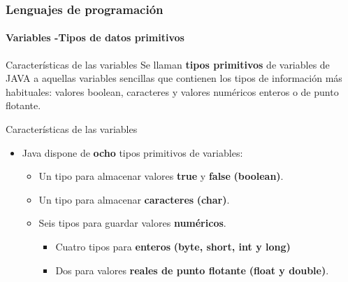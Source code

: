\documentclass{beamer}
\begin{document}
		\begin{frame}
			\frametitle{Lenguajes de programaci\'on}
			\framesubtitle{Variables -Tipos de datos primitivos}

			\begin{exampleblock}{Caracter\'isticas de las variables}
				Se llaman \textbf{tipos primitivos} de variables de JAVA a aquellas variables sencillas que contienen los tipos de informaci\'on m\'as habituales: valores boolean, caracteres y valores num\'ericos enteros o de punto flotante. 
			\end{exampleblock}
			
			\begin{block}{Caracter\'isticas de las variables}
				\begin{itemize}
					\item Java dispone de \textbf{ocho} tipos primitivos de variables:
					\begin{itemize}
						\item Un tipo para almacenar valores \textbf{true} y  \textbf{false}  \textbf{(boolean)}.
						\item Un tipo para almacenar \textbf{caracteres}  \textbf{(char)}.
						\item Seis tipos para guardar valores \textbf{num\'ericos}.
						\begin{itemize}
							\item Cuatro tipos para \textbf{enteros} \textbf{(byte, short, int y long)}
							\item Dos para valores \textbf{reales de punto flotante} \textbf{(float y double)}.
						\end{itemize}
					\end{itemize}
				\end{itemize}
			\end{block}
		\end{frame}
\end{document}
